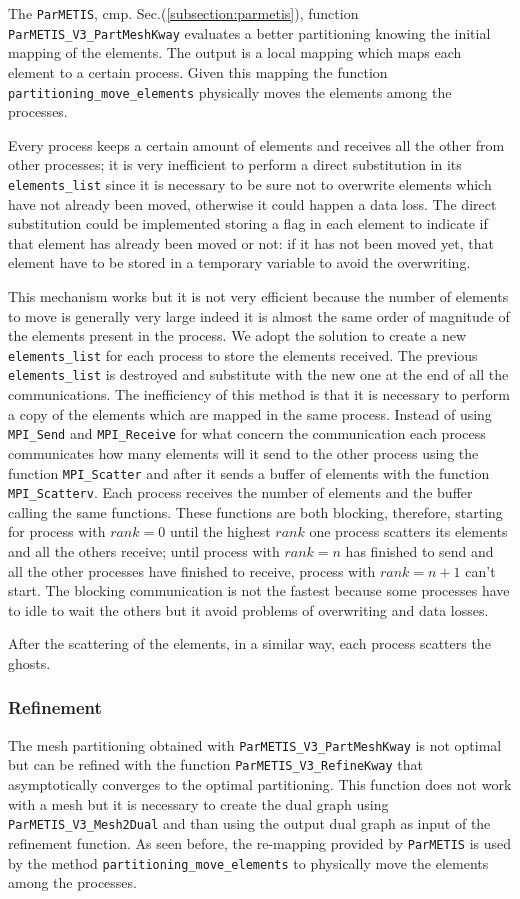 The \verb|ParMETIS|, cmp. Sec.(\ref{subsection:parmetis}), function \verb|ParMETIS_V3_PartMeshKway| evaluates a better partitioning knowing the initial mapping of the elements. The output is a local mapping which maps each element to a certain process. Given this mapping the function \verb|partitioning_move_elements| physically moves the elements among the processes.
\medskip

Every process keeps a certain amount of elements and receives all the other from other processes; it is very inefficient to perform a direct substitution in its \verb|elements_list| since it is necessary to be sure not to overwrite elements which have not already been moved, otherwise it could happen a data loss. The direct substitution could be implemented storing a flag in each element to indicate if that element has already been moved or not: if it has not been moved yet, that element have to be stored in a temporary variable to avoid the overwriting.

This mechanism works but it is not very efficient because the number of elements to move is generally very large indeed it is almost the same order of magnitude of the elements present in the process. We adopt the solution to create a new \verb|elements_list| for each process to store the elements received. The previous \verb|elements_list| is destroyed and substitute with the new one at the end of all the communications. The inefficiency of this method is that it is necessary to perform a copy of the elements which are mapped in the same process. Instead of using \verb|MPI_Send| and \verb|MPI_Receive| for what concern the communication each process communicates how many elements will it send to the other process using the function \verb|MPI_Scatter| and after it sends a buffer of elements with the function \verb|MPI_Scatterv|. Each process receives the number of elements and the buffer calling the same functions. These functions are both blocking, therefore, starting for process with $rank=0$ until the
highest $rank$ one process scatters its elements and all the others receive; until process with $rank=n$ has finished to send and all the other processes have finished to receive, process with $rank=n+1$ can't start. The blocking communication is not the fastest because some processes have to idle to wait the others but it avoid problems of overwriting and data losses.
\medskip

After the scattering of the elements, in a similar way, each process scatters the ghosts.

\subsubsection{Refinement}
The mesh partitioning obtained with \verb|ParMETIS_V3_PartMeshKway| is not optimal but can be refined with the function \verb|ParMETIS_V3_RefineKway| that asymptotically converges to the optimal partitioning. This function does not work with a mesh but it is necessary to create the dual graph using \verb|ParMETIS_V3_Mesh2Dual| and than using the output dual graph as input of the refinement function. As seen before, the re-mapping provided by \verb|ParMETIS| is used by the method \verb|partitioning_move_elements| to physically move the elements among the processes.

